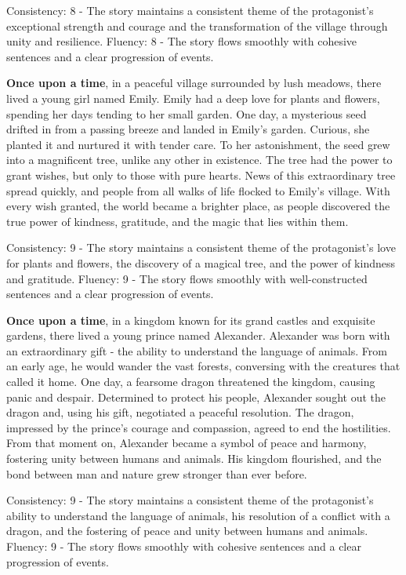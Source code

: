 \documentclass{article}
\begin{document}
Consistency: 8 - The story maintains a consistent theme of the protagonist's exceptional strength and courage and the transformation of the village through unity and resilience.
Fluency: 8 - The story flows smoothly with cohesive sentences and a clear progression of events.

\textbf{Once upon a time}, in a peaceful village surrounded by lush meadows, there lived a young girl named Emily. Emily had a deep love for plants and flowers, spending her days tending to her small garden. One day, a mysterious seed drifted in from a passing breeze and landed in Emily's garden. Curious, she planted it and nurtured it with tender care. To her astonishment, the seed grew into a magnificent tree, unlike any other in existence. The tree had the power to grant wishes, but only to those with pure hearts. News of this extraordinary tree spread quickly, and people from all walks of life flocked to Emily's village. With every wish granted, the world became a brighter place, as people discovered the true power of kindness, gratitude, and the magic that lies within them.

Consistency: 9 - The story maintains a consistent theme of the protagonist's love for plants and flowers, the discovery of a magical tree, and the power of kindness and gratitude.
Fluency: 9 - The story flows smoothly with well-constructed sentences and a clear progression of events.

\textbf{Once upon a time}, in a kingdom known for its grand castles and exquisite gardens, there lived a young prince named Alexander. Alexander was born with an extraordinary gift - the ability to understand the language of animals. From an early age, he would wander the vast forests, conversing with the creatures that called it home. One day, a fearsome dragon threatened the kingdom, causing panic and despair. Determined to protect his people, Alexander sought out the dragon and, using his gift, negotiated a peaceful resolution. The dragon, impressed by the prince's courage and compassion, agreed to end the hostilities. From that moment on, Alexander became a symbol of peace and harmony, fostering unity between humans and animals. His kingdom flourished, and the bond between man and nature grew stronger than ever before.

Consistency: 9 - The story maintains a consistent theme of the protagonist's ability to understand the language of animals, his resolution of a conflict with a dragon, and the fostering of peace and unity between humans and animals.
Fluency: 9 - The story flows smoothly with cohesive sentences and a clear progression of events.
\end{document}
